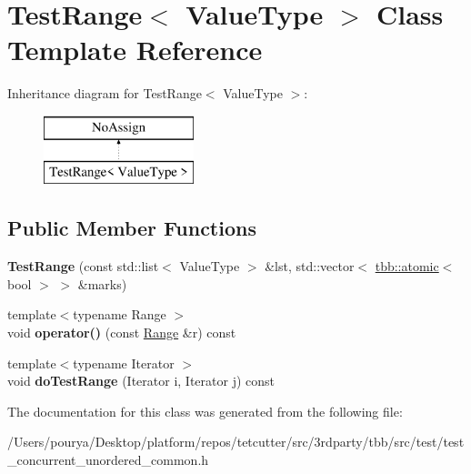 \hypertarget{classTestRange}{}\section{Test\+Range$<$ Value\+Type $>$ Class Template Reference}
\label{classTestRange}
Inheritance diagram for Test\+Range$<$ Value\+Type $>$\+:\begin{figure}[H]
\begin{center}
\leavevmode
\includegraphics[height=2.000000cm]{classTestRange}
\end{center}
\end{figure}
\subsection*{Public Member Functions}
\begin{DoxyCompactItemize}
\item 
\hypertarget{classTestRange_a3130b47b0bbf834d6228b47613a7a073}{}{\bfseries Test\+Range} (const std\+::list$<$ Value\+Type $>$ \&lst, std\+::vector$<$ \hyperlink{structtbb_1_1atomic}{tbb\+::atomic}$<$ bool $>$ $>$ \&marks)\label{classTestRange_a3130b47b0bbf834d6228b47613a7a073}

\item 
\hypertarget{classTestRange_ad98ff32326da39f6f838bdb1e3215c03}{}{\footnotesize template$<$typename Range $>$ }\\void {\bfseries operator()} (const \hyperlink{classtbb_1_1blocked__range}{Range} \&r) const \label{classTestRange_ad98ff32326da39f6f838bdb1e3215c03}

\item 
\hypertarget{classTestRange_a4a170028d2a51410de80b765f91783a8}{}{\footnotesize template$<$typename Iterator $>$ }\\void {\bfseries do\+Test\+Range} (Iterator i, Iterator j) const \label{classTestRange_a4a170028d2a51410de80b765f91783a8}

\end{DoxyCompactItemize}


The documentation for this class was generated from the following file\+:\begin{DoxyCompactItemize}
\item 
/\+Users/pourya/\+Desktop/platform/repos/tetcutter/src/3rdparty/tbb/src/test/test\+\_\+concurrent\+\_\+unordered\+\_\+common.\+h\end{DoxyCompactItemize}

